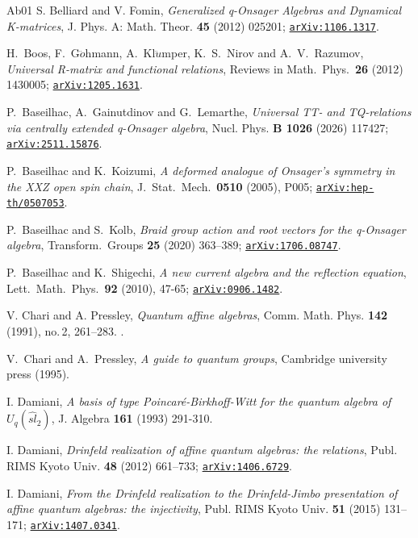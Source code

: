 \documentclass[11pt]{amsart}
\numberwithin{equation}{section}
\numberwithin{equation}{section}
\begin{document}
\begin{thebibliography}{Ab01}
S. Belliard and V. Fomin, {\it Generalized q-Onsager Algebras and Dynamical K-matrices},  J. Phys. A: Math. Theor. {\bf 45} (2012) 025201; \href{https://arxiv.org/abs/1106.1317}{\tt arXiv:1106.1317}.

 H.\ Boos, F.\ G$\ddot{o}$hmann, A.\ Kl$\ddot{u}$mper, K.\ S.\ Nirov and A.\ V.\ Razumov, \textit{Universal R-matrix and functional relations}, Reviews in Math.\ Phys.\  {\bf 26} (2012) 1430005; \href{https://arxiv.org/abs/1205.1631}{\tt arXiv:1205.1631}. 

 P.\ Baseilhac, A.\ Gainutdinov and G.\ Lemarthe,   
{\it Universal TT- and TQ-relations via centrally extended q-Onsager algebra}, Nucl. Phys. {\bf B 1026} (2026) 117427;
\href{https://arxiv.org/abs/2511.15876}{\tt arXiv:2511.15876}.

 P.\ Baseilhac and K.\ Koizumi, \textit{A deformed analogue of Onsager’s
	symmetry in the XXZ open spin chain}, J.\ Stat.\ Mech.\
{\bf 0510} (2005), P005; \href{https://arxiv.org/abs/hep-th/0507053}{\tt arXiv:hep-th/0507053}.

P.\ Baseilhac and S.\ Kolb, \textit{Braid group action and root vectors for the q-Onsager algebra}, Transform.\ Groups {\bf 25} (2020) 363–389; \href{https://arxiv.org/abs/1706.08747}{\tt arXiv:1706.08747}.

P.\ Baseilhac and K.\ Shigechi, {\it A new current algebra and the reflection equation}, Lett.\ Math.\ Phys.\ {\bf 92} (2010), 47-65; \href{https://arxiv.org/abs/0906.1482}{\tt arXiv:0906.1482}.

V. Chari and A. Pressley, {\it Quantum affine algebras}, Comm. Math. Phys.
\textbf{142} (1991), no.\,2, 261--283. \MR{1137064}.

V.\ Chari and A.\ Pressley, {\it A guide to quantum groups}, Cambridge university press (1995).

I. Damiani, {\it A basis of type Poincar\'e-Birkhoff-Witt for the quantum algebra of $U_q(\widehat{sl}_2)$}, J. Algebra {\bf 161} (1993) 291-310.


I. Damiani, {\it Drinfeld realization of affine quantum algebras: the relations}, Publ. RIMS Kyoto Univ. {\bf 48} (2012) 661–733; 
\href{https://arxiv.org/abs/arXiv:1406.6729}{\tt arXiv:1406.6729}.

I. Damiani, {\it From the Drinfeld realization to the Drinfeld-Jimbo presentation of affine quantum algebras: the injectivity}, 
Publ. RIMS Kyoto Univ. {\bf 51} (2015) 131–171;
\href{https://arxiv.org/abs/arXiv:1407.0341}{\tt arXiv:1407.0341}.




\end{thebibliography}
\end{document}
